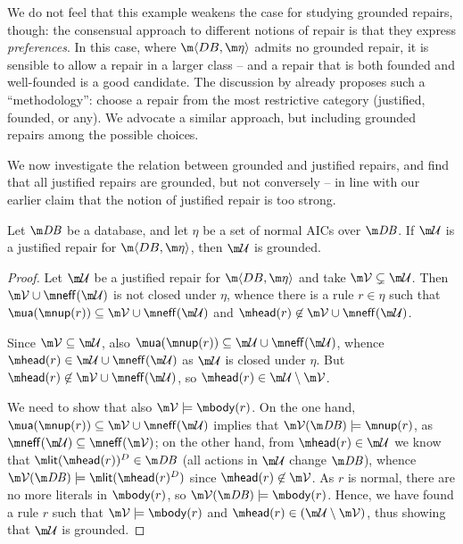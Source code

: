 We do not feel that this example weakens the case for studying grounded repairs, though: the consensual approach to different notions of repair is that they express \emph{preferences}.
In this case, where $\fulldb$ admits no grounded repair, it is sensible to allow a repair in a larger class -- and a repair that is both founded and well-founded is a good candidate.
The discussion by \citet[Section 8]{tplp/CaropreseT11} already proposes such a ``methodology'': choose a repair from the most restrictive category (justified, founded, or any).
We advocate a similar approach, but including grounded repairs among the possible choices.


We now investigate the relation between grounded and justified repairs, and find that all justified repairs are grounded, but not conversely -- in line with our earlier claim that the notion of justified repair is too strong.

\begin{proposition}
  \label{prop:justified}
  Let $\db$ be a database, and let $\eta$ be a set of normal AICs over $\db$. If $\UU$ is a justified repair for $\fulldb$, then $\UU$ is grounded.
\end{proposition}
\begin{proof}
  Let $\UU$ be a justified repair for $\fulldb$ and take $\VV\subsetneq\UU$.
  Then $\VV\cup\neff(\UU)$ is not closed under $\eta$, whence there is a rule $r\in\eta$ such that $\actof(\nup(r))\subseteq\VV\cup\neff(\UU)$ and $\head(r)\not\in\VV\cup\neff(\UU)$.

  Since $\VV\subseteq\UU$, also $\actof(\nup(r))\subseteq\UU\cup\neff(\UU)$, whence $\head(r)\in\UU\cup\neff(\UU)$ as $\UU$ is closed under $\eta$.
  But $\head(r)\not\in\VV\cup\neff(\UU)$, so $\head(r)\in\UU\setminus\VV$.

  We need to show that also $\VV\models\body(r)$. On the one hand, $\actof(\nup(r))\subseteq\VV\cup\neff(\UU)$ implies that $\VV(\db)\models\nup(r)$, as $\neff(\UU)\subseteq\neff(\VV)$; on the other hand, from $\head(r)\in\UU$ we know that $\litof(\head(r))^D\in\db$ (all actions in $\UU$ change $\db$), whence $\VV(\db)\models\litof(\head(r)^D)$ since $\head(r)\not\in\VV$.
  As $r$ is normal, there are no more literals in $\body(r)$, so $\VV(\db)\models\body(r)$. 
  Hence, we have found a rule $r$ such that $\VV\models \body(r)$ and $\head(r)\in(\UU\setminus\VV)$, thus showing that $\UU$ is grounded.
\end{proof}

